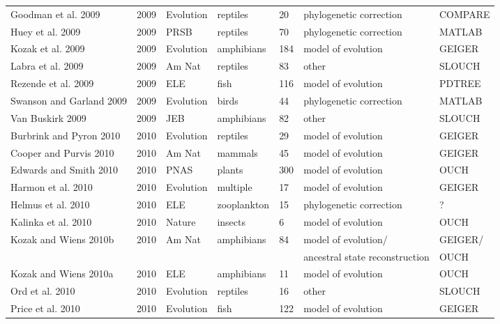 \begin{landscape}
\begin{center}
\begin{longtable}{p{6cm}llllll}
Goodman et al. 2009   &   2009    &   Evolution   &   reptiles    &   20  &   phylogenetic correction &   COMPARE \\
Huey et al. 2009  &   2009    &   PRSB    &   reptiles    &   70  &   phylogenetic correction &   MATLAB  \\
Kozak et al. 2009 &   2009    &   Evolution   &   amphibians  &   184 &   model of evolution  &   GEIGER  \\
Labra et al. 2009 &   2009    &   Am Nat  &   reptiles    &   83  &   other   &   SLOUCH  \\
Rezende et al. 2009   &   2009    &   ELE &   fish    &   116 &   model of evolution  &   PDTREE  \\
Swanson and Garland 2009  &   2009    &   Evolution   &   birds   &   44  &   phylogenetic correction &   MATLAB  \\
Van Buskirk 2009  &   2009    &   JEB &   amphibians  &   82  &   other   &   SLOUCH  \\
Burbrink and Pyron 2010   &   2010    &   Evolution   &   reptiles    &   29  &   model of evolution  &   GEIGER  \\
Cooper and Purvis 2010    &   2010    &   Am Nat  &   mammals &   45  &   model of evolution  &   GEIGER  \\
Edwards and Smith 2010    &   2010    &   PNAS    &   plants  &   300 &   model of evolution  &   OUCH    \\
Harmon et al. 2010    &   2010    &   Evolution   &   multiple    &   17  &   model of evolution  &   GEIGER  \\
Helmus et al. 2010    &   2010    &   ELE &   zooplankton &   15  &   phylogenetic correction &   ?   \\
Kalinka et al. 2010   &   2010    &   Nature  &   insects &   6   &   model of evolution  &   OUCH    \\
Kozak and Wiens 2010b &   2010    &   Am Nat  &   amphibians  &   84  &   model of evolution/ &   GEIGER/ \\
    &       &       &       &       &   ancestral state reconstruction  &   OUCH    \\
Kozak and Wiens 2010a &   2010    &   ELE &   amphibians  &   11  &   model of evolution  &   OUCH    \\
Ord et al. 2010   &   2010    &   Evolution   &   reptiles    &   16  &   other   &   SLOUCH  \\
Price et al. 2010 &   2010    &   Evolution   &   fish    &   122 &   model of evolution  &   GEIGER  \\

\end{longtable}
\end{center}
\end{landscape}
